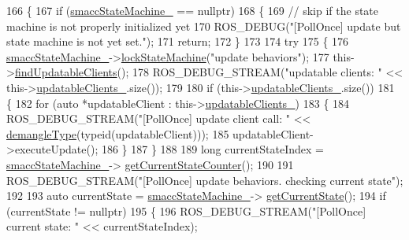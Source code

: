 \begin{DoxyCode}
166 \{
167     \textcolor{keywordflow}{if} (\hyperlink{classsmacc_1_1SignalDetector_a46025de6ac7b5980e22144f9703236a4}{smaccStateMachine\_} == \textcolor{keyword}{nullptr})
168     \{
169         \textcolor{comment}{// skip if the state machine is not properly initialized yet}
170         ROS\_DEBUG(\textcolor{stringliteral}{"[PollOnce] update but state machine is not yet set."});
171         \textcolor{keywordflow}{return};
172     \}
173 
174     \textcolor{keywordflow}{try}
175     \{
176         \hyperlink{classsmacc_1_1SignalDetector_a46025de6ac7b5980e22144f9703236a4}{smaccStateMachine\_}->\hyperlink{classsmacc_1_1ISmaccStateMachine_a5c8d4c9a4b11c7950266a00e48080ce3}{lockStateMachine}(\textcolor{stringliteral}{"update behaviors"});
177         this->\hyperlink{classsmacc_1_1SignalDetector_a47ec2df560e2e33758ce3975bece9385}{findUpdatableClients}();
178         ROS\_DEBUG\_STREAM(\textcolor{stringliteral}{"updatable clients: "} << this->\hyperlink{classsmacc_1_1SignalDetector_a01a457b4ec935473d6426efb7b87e683}{updatableClients\_}.size());
179 
180         \textcolor{keywordflow}{if} (this->\hyperlink{classsmacc_1_1SignalDetector_a01a457b4ec935473d6426efb7b87e683}{updatableClients\_}.size())
181         \{
182             \textcolor{keywordflow}{for} (\textcolor{keyword}{auto} *updatableClient : this->\hyperlink{classsmacc_1_1SignalDetector_a01a457b4ec935473d6426efb7b87e683}{updatableClients\_})
183             \{
184                 ROS\_DEBUG\_STREAM(\textcolor{stringliteral}{"[PollOnce] update client call:  "} << 
      \hyperlink{namespacesmacc_1_1introspection_a670e39ccea29952859df4e2d0e45077b}{demangleType}(\textcolor{keyword}{typeid}(updatableClient)));
185                 updatableClient->executeUpdate();
186             \}
187         \}
188 
189         \textcolor{keywordtype}{long} currentStateIndex = \hyperlink{classsmacc_1_1SignalDetector_a46025de6ac7b5980e22144f9703236a4}{smaccStateMachine\_}->
      \hyperlink{classsmacc_1_1ISmaccStateMachine_aad27c0182b53245d0aded22e63cd83bd}{getCurrentStateCounter}();
190 
191         ROS\_DEBUG\_STREAM(\textcolor{stringliteral}{"[PollOnce] update behaviors. checking current state"});
192 
193         \textcolor{keyword}{auto} currentState = \hyperlink{classsmacc_1_1SignalDetector_a46025de6ac7b5980e22144f9703236a4}{smaccStateMachine\_}->
      \hyperlink{classsmacc_1_1ISmaccStateMachine_a610d09dc5341fb63732be713c21fbe86}{getCurrentState}();
194         \textcolor{keywordflow}{if} (currentState != \textcolor{keyword}{nullptr})
195         \{
196             ROS\_DEBUG\_STREAM(\textcolor{stringliteral}{"[PollOnce] current state: "} << currentStateIndex);

\end{DoxyCode}
